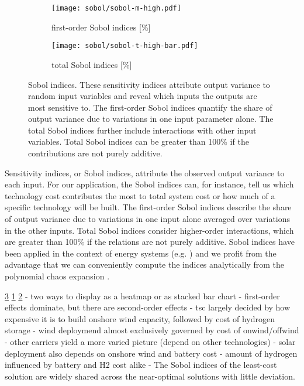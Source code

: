 
\begin{figure}
    \begin{subfigure}[t]{0.45\textwidth}
        \caption{first-order Sobol indices [\%]}
        \label{fig:sobol:first}
        \texttt{[image: sobol/sobol-m-high.pdf]}
    \end{subfigure}
    \begin{subfigure}[t]{0.54\textwidth}
        \caption{total Sobol indices [\%]}
        \label{fig:sobol:total}
        \texttt{[image: sobol/sobol-t-high-bar.pdf]}
    \end{subfigure}
    \caption[First-order and total Sobol indices]{
      Sobol indices. These sensitivity indices attribute output variance to random input variables
      and reveal which inputs the outputs are most sensitive to. The first-order Sobol indices
      quantify the share of output variance due to variations in one input parameter alone.
      The total Sobol indices further include interactions with other input variables.
      Total Sobol indices can be greater than 100\% if the contributions are not purely additive.
    }
    \label{fig:sobol}
\end{figure}

Sensitivity indices, or Sobol indices, attribute the observed output variance to each input.
For our application, the Sobol indices can, for instance, tell us which technology cost
contributes the most to total system cost or how much of a specific technology will be built.
The first-order Sobol indices describe the share of output variance
due to variations in one input alone averaged over variations in the other inputs.
Total Sobol indices consider higher-order interactions,
which are greater than 100\% if the relations are not purely additive.
Sobol indices have been applied in the context of energy systems (e.g. \cite{trondle_trade-offs_2020,mavromatidis_uncertainty_2018})
and we profit from the advantage that we can conveniently compute the indices analytically
from the polynomial chaos expansion \cite{sudret_global_2008}.

\cref{fig:sobol} \cref{fig:sobol:first} \cref{fig:sobol:total}
- two ways to display as a heatmap or as stacked bar chart
- first-order effects dominate, but there are second-order effects
- tsc largely decided by how expensive it is to build onshore wind capacity, followed by cost of hydrogen storage
- wind deploymend almost exclusively governed by cost of onwind/offwind
- other carriers yield a more varied picture (depend on other technologies)
- solar deployment also depends on onshore wind and battery cost
- amount of hydrogen influenced by battery and H2 cost alike
- The Sobol indices of the least-cost solution are widely shared across the near-optimal solutions with little deviation.

